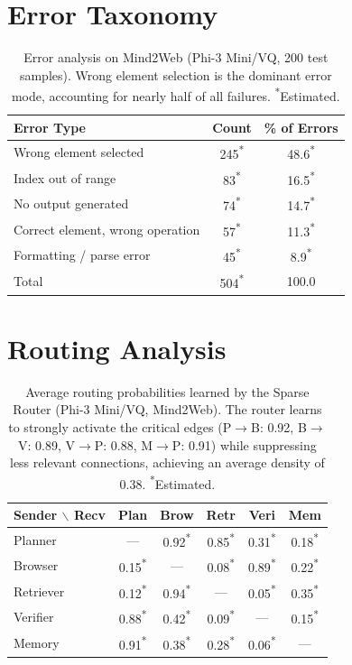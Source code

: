 \documentclass{article}
\newcommand{\tbd}[1]{#1\textsuperscript{*}}
\begin{document}
\section{Error Taxonomy}
\label{app:errors}

\begin{table}[h]
\centering
\caption{Error analysis on Mind2Web (Phi-3 Mini/VQ, 200 test samples).  Wrong element selection is the dominant error mode, accounting for nearly half of all failures.  \textsuperscript{*}Estimated.}
\small
\begin{tabular}{lcc}
\toprule
\textbf{Error Type} & \textbf{Count} & \textbf{\% of Errors} \\
\midrule
Wrong element selected & \tbd{245} & \tbd{48.6} \\
Index out of range & \tbd{83} & \tbd{16.5} \\
No output generated & \tbd{74} & \tbd{14.7} \\
Correct element, wrong operation & \tbd{57} & \tbd{11.3} \\
Formatting / parse error & \tbd{45} & \tbd{8.9} \\
\midrule
Total & \tbd{504} & 100.0 \\
\bottomrule
\end{tabular}
\end{table}

\section{Routing Analysis}
\label{app:routing}

\begin{table}[h]
\centering
\caption{Average routing probabilities learned by the Sparse Router (Phi-3 Mini/VQ, Mind2Web).  The router learns to strongly activate the critical edges (P$\to$B: 0.92, B$\to$V: 0.89, V$\to$P: 0.88, M$\to$P: 0.91) while suppressing less relevant connections, achieving an average density of 0.38.  \textsuperscript{*}Estimated.}
\small
\begin{tabular}{l|ccccc}
\toprule
\textbf{Sender $\backslash$ Recv} & \textbf{Plan} & \textbf{Brow} & \textbf{Retr} & \textbf{Veri} & \textbf{Mem} \\
\midrule
Planner & --- & \tbd{0.92} & \tbd{0.85} & \tbd{0.31} & \tbd{0.18} \\
Browser & \tbd{0.15} & --- & \tbd{0.08} & \tbd{0.89} & \tbd{0.22} \\
Retriever & \tbd{0.12} & \tbd{0.94} & --- & \tbd{0.05} & \tbd{0.35} \\
Verifier & \tbd{0.88} & \tbd{0.42} & \tbd{0.09} & --- & \tbd{0.15} \\
Memory & \tbd{0.91} & \tbd{0.38} & \tbd{0.28} & \tbd{0.06} & --- \\
\bottomrule
\end{tabular}
\end{table}
\end{document}
